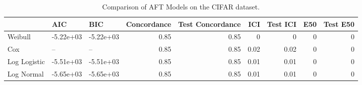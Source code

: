 \begin{table*}
\centering
\caption{Comparison of AFT Models on the CIFAR dataset.}
\label{tab:cifar}
\begin{tabular}{lllrrrrrr}
\toprule
 & AIC & BIC & Concordance & Test Concordance & ICI & Test ICI & E50 & Test E50 \\
\midrule
Weibull & -5.22e+03 & -5.22e+03 & 0.85 & 0.85 & 0 & 0 & 0 & 0 \\
Cox & -- & -- & 0.85 & 0.85 & 0.02 & 0.02 & 0 & 0 \\
Log Logistic & -5.51e+03 & -5.51e+03 & 0.85 & 0.85 & 0.01 & 0.01 & 0 & 0 \\
Log Normal & -5.65e+03 & -5.65e+03 & 0.85 & 0.85 & 0.01 & 0.01 & 0 & 0 \\
\bottomrule
\end{tabular}
\end{table*}

